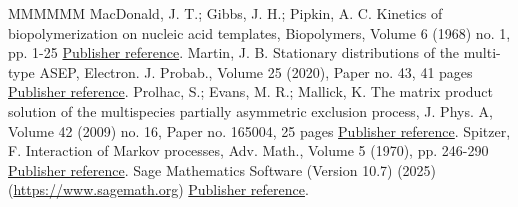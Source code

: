\documentclass[11pt]{article}
\theoremstyle{definition}
\numberwithin{equation}{section}
\begin{document}
\begin{thebibliography}{MMMMMM}
 MacDonald, J. T.; Gibbs, J. H.; Pipkin, A. C. Kinetics of biopolymerization on nucleic acid templates, Biopolymers, Volume 6 (1968) no. 1, pp. 1-25 \href{https://alco.centre-mersenne.org/articles/10.5802/alco.457/#MGP}{Publisher reference}.
 Martin, J. B. Stationary distributions of the multi-type ASEP, Electron. J. Probab., Volume 25 (2020), Paper no. 43, 41 pages \href{https://alco.centre-mersenne.org/articles/10.5802/alco.457/#Martin20}{Publisher reference}.
 Prolhac, S.; Evans, M. R.; Mallick, K. The matrix product solution of the multispecies partially asymmetric exclusion process, J. Phys. A, Volume 42 (2009) no. 16, Paper no. 165004, 25 pages \href{https://alco.centre-mersenne.org/articles/10.5802/alco.457/#PEM}{Publisher reference}.
 Spitzer, F. Interaction of Markov processes, Adv. Math., Volume 5 (1970), pp. 246-290 \href{https://alco.centre-mersenne.org/articles/10.5802/alco.457/#Sp}{Publisher reference}.
 Sage Mathematics Software (Version 10.7) (2025) (\url{https://www.sagemath.org}) \href{https://alco.centre-mersenne.org/articles/10.5802/alco.457/#sage}{Publisher reference}.
\end{thebibliography}
\end{document}
